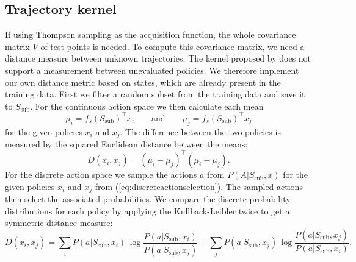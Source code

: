 \subsection{Trajectory kernel}
\label{sec:ownTK}
If using Thompson sampling as the acquisition function, the whole covariance matrix $V$ of test points is needed. To compute this covariance matrix, we need a distance measure between unknown trajectories. The kernel proposed by \cite{wilson2014using} does not support a measurement between unevaluated policies. We therefore implement our own distance metric based on states, which are already present in the training data. First we filter a random subset from the training data and save it to $S_{\text{sub}}$. For the continuous action space we then calculate each mean
$$\mu_i = f_s(S_{\text{sub}})^\top x_i \qquad \text{and}\qquad \mu_j = f_s(S_{\text{sub}})^\top x_j$$
for the given policies $x_i$ and $x_j$. The difference between the two policies is measured by the squared Euclidean distance between the means:
$$D(x_i,x_j) = (\mu_i - \mu_j)^\top (\mu_i - \mu_j).$$
For the discrete action space we sample the actions $a$ from $P(A|S_{\text{sub}},x)$ for the given policies $x_i$ and $x_j$ from (\ref{eq:discreteactionselection}). The sampled actions then select the associated probabilities. We compare the discrete probability distributions for each policy by applying the Kullback-Leibler twice to get a symmetric distance measure:
$$D(x_i,x_j) = \sum _{i}P(a|S_{\text{sub}},x_i)\,\log {\frac {P(a|S_{\text{sub}},x_i)}{P(a|S_{\text{sub}},x_j)}} + \sum _{j}P(a|S_{\text{sub}},x_j)\,\log {\frac {P(a|S_{\text{sub}},x_j)}{P(a|S_{\text{sub}},x_i)}}.$$

%

